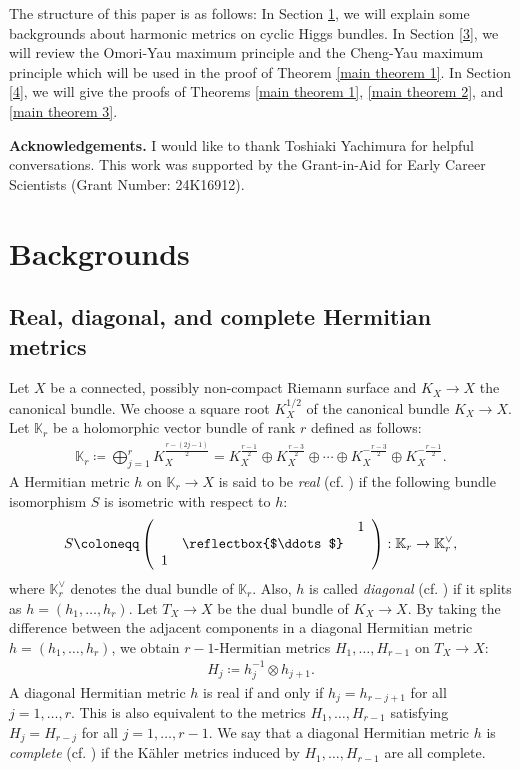 \documentclass[12pt]{article}
\theoremstyle{definition}
\def\K{{\mathbb K}}
\begin{document}
The structure of this paper is as follows: In Section \ref{2}, we will explain some backgrounds about harmonic metrics on cyclic Higgs bundles. In Section \ref{3}, we will review the Omori-Yau maximum principle and the Cheng-Yau maximum principle which will be used in the proof of Theorem \ref{main theorem 1}. In Section \ref{4}, we will give the proofs of Theorems \ref{main theorem 1}, \ref{main theorem 2}, and \ref{main theorem 3}.

\noindent
{\bf Acknowledgements.} I would like to thank Toshiaki Yachimura for helpful conversations. This work was supported by the Grant-in-Aid for Early Career Scientists (Grant Number: 24K16912).

\section{Backgrounds}\label{2}
\subsection{Real, diagonal, and complete Hermitian metrics}\label{rdc}
Let $X$ be a connected, possibly non-compact Riemann surface and $K_X\rightarrow X$ the canonical bundle. We choose a square root $K_X^{1/2}$ of the canonical bundle $K_X\rightarrow X$. Let $\K_r$ be a holomorphic vector bundle of rank $r$ defined as follows:
\begin{align*}
\K_r\coloneqq \bigoplus_{j=1}^r K_X^{\frac{r-(2j-1)}{2}} = K_X^{\frac{r-1}{2}} \oplus K_X^{\frac{r-3}{2}} \oplus \cdots \oplus K_X^{-\frac{r-3}{2}} \oplus K_X^{-\frac{r-1}{2}}.
\end{align*}
A Hermitian metric $h$ on $\K_r\rightarrow X$ is said to be {\it real} (cf. \cite{Hit2}) if the following bundle isomorphism $S$ is isometric with respect to $h$:
\begin{align*}
S\coloneqq \left(
\begin{array}{ccc}
& & 1 \\ 
& \reflectbox{$\ddots$} & \\ 
1 & &
\end{array}
\right): \K_r\rightarrow \K_r^{\vee},
\end{align*}
where $\K_r^{\vee}$ denotes the dual bundle of $\K_r$. Also, $h$ is called {\it diagonal} (cf. \cite{Bar1, Col1, DL2}) if it splits as $h=(h_1,\dots, h_r)$. Let $T_X\rightarrow X$ be the dual bundle of $K_X\rightarrow X$. By taking the difference between the adjacent components in a diagonal Hermitian metric $h=(h_1,\dots, h_r)$, we obtain $r-1$-Hermitian metrics $H_1,\dots, H_{r-1}$ on $T_X\rightarrow X$:
\begin{align*}
H_j\coloneqq h_j^{-1}\otimes h_{j+1}.
\end{align*}
A diagonal Hermitian metric $h$ is real if and only if $h_j=h_{r-j+1}$ for all $j=1,\dots, r$. This is also equivalent to the metrics $H_1,\dots, H_{r-1}$ satisfying $H_j=H_{r-j}$ for all $j=1,\dots, r-1$. We say that a diagonal Hermitian metric $h$ is {\it complete} (cf. \cite{LM1}) if the K\"ahler metrics induced by $H_1,\dots, H_{r-1}$ are all complete. 
\end{document}

